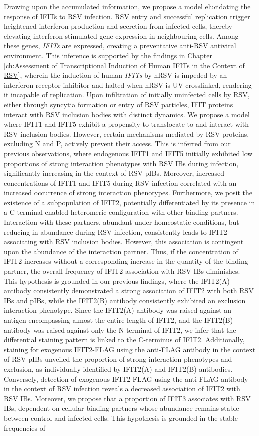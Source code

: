 Drawing upon the accumulated information, we propose a model elucidating the response of IFITs to RSV infection. RSV entry and successful replication trigger heightened interferon production and secretion from infected cells, thereby elevating interferon-stimulated gene expression in neighbouring cells. Among these genes, \textit{IFITs} are expressed, creating a preventative anti-RSV antiviral environment. This inference is supported by the findings in Chapter \ref{ch:Assessment of Transcriptional Induction of Human IFITs in the Context of RSV}, wherein the induction of human \textit{IFITs} by hRSV is impeded by an interferon receptor inhibitor and halted when hRSV is UV-crosslinked, rendering it incapable of replication. Upon infiltration of initially uninfected cells by RSV, either through syncytia formation or entry of RSV particles, IFIT proteins interact with RSV inclusion bodies with distinct dynamics. We propose a model where IFIT1 and IFIT5 exhibit a propensity to translocate to and interact with RSV inclusion bodies. However, certain mechanisms mediated by RSV proteins, excluding N and P, actively prevent their access. This is inferred from our previous observations, where endogenous IFIT1 and IFIT5 initially exhibited low proportions of strong interaction phenotypes with RSV IBs during infection, significantly increasing in the context of RSV pIBs. Moreover, increased concentrations of IFIT1 and IFIT5 during RSV infection correlated with an increased occurrence of strong interaction phenotypes. Furthermore, we posit the existence of a subpopulation of IFIT2, potentially differentiated by its presence in a C-terminal-enabled heteromeric configuration with other binding partners. Interaction with these partners, abundant under homeostatic conditions, but reducing in abundance during RSV infection, consistently leads to IFIT2 associating with RSV inclusion bodies. However, this association is contingent upon the abundance of the interaction partner. Thus, if the concentration of IFIT2 increases without a corresponding increase in the quantity of the binding partner, the overall frequency of IFIT2 association with RSV IBs diminishes. This hypothesis is grounded in our previous findings, where the IFIT2(A) antibody consistently demonstrated a strong association of IFIT2 with both RSV IBs and pIBs, while the IFIT2(B) antibody consistently exhibited an exclusion interaction phenotype. Since the IFIT2(A) antibody was raised against an antigen encompassing almost the entire length of IFIT2, and the IFIT2(B) antibody was raised against only the N-terminal of IFIT2, we infer that the differential staining pattern is linked to the C-terminus of IFIT2. Additionally, staining for exogenous IFIT2-FLAG using the anti-FLAG antibody in the context of RSV pIBs unveiled the proportion of strong interaction phenotypes and exclusion, as individually identified by IFIT2(A) and IFIT2(B) antibodies. Conversely, detection of exogenous IFIT2-FLAG using the anti-FLAG antibody in the context of RSV infection reveals a decreased association of IFIT2 with RSV IBs. Moreover, we propose that a proportion of IFIT3 associates with RSV IBs, dependent on cellular binding partners whose abundance remains stable between control and infected cells. This hypothesis is grounded in the stable frequencies of 